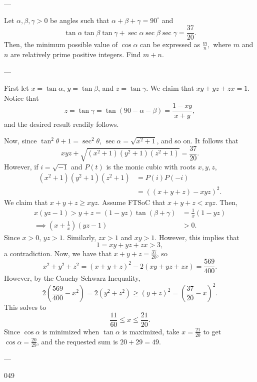 
---

Let $\alpha, \beta, \gamma>0$ be angles such that $\alpha+\beta+\gamma=90^\circ$ and \[\tan\alpha\tan\beta\tan\gamma+\sec\alpha\sec\beta\sec\gamma=\frac{37}{20}.\]Then, the minimum possible value of $\cos \alpha$ can be expressed as $\tfrac mn,$ where $m$ and $n$ are relatively prime positive integers$.$ Find $m+n.$

---

First let $x=\tan\alpha$, $y=\tan\beta$, and $z=\tan\gamma$. We claim that $xy+yz+zx=1$. Notice that \[z=\tan\gamma=\tan(90-\alpha-\beta)=\frac{1-xy}{x+y},\]
and the desired result readily follows.

Now, since $\tan^2\theta+1=\sec^2\theta$, $\sec\alpha=\sqrt{x^2+1}$, and so on. It follows that \[xyz+\sqrt{(x^2+1)(y^2+1)(z^2+1)}=\frac{37}{20}.\]
However, if $i=\sqrt{-1}$ and $P(t)$ is the monic cubic with roots $x,y,z$,
\begin{align*}
    (x^2+1)(y^2+1)(z^2+1)&=P(i)P(-i)\\
    &=((x+y+z)-xyz)^2.
\end{align*}
We claim that $x+y+z\ge xyz$. Assume FTSoC that $x+y+z<xyz$. Then,
\begin{align*}
    x(yz-1)>y+z=(1-yz)\tan(\beta+\gamma)&=\frac1x(1-yz)\\
    \implies \left(x+\frac1x\right)(yz-1)&>0.
\end{align*}
Since $x>0$, $yz>1$. Similarly, $zx>1$ and $xy>1$. However, this implies that \[1=xy+yz+zx>3,\]
a contradiction. Now, we have that $x+y+z=\tfrac{37}{20}$, so \[x^2+y^2+z^2=(x+y+z)^2-2(xy+yz+zx)=\frac{569}{400}.\]
However, by the Cauchy-Schwarz Inequality, \[2\left(\frac{569}{400}-x^2\right)=2(y^2+z^2)\ge (y+z)^2=\left(\frac{37}{20}-x\right)^2.\]
This solves to \[\frac{11}{60}\le x\le\frac{21}{20}.\]
Since $\cos\alpha$ is minimized when $\tan\alpha$ is maximized, take $x=\frac{21}{20}$ to get $\cos\alpha=\frac{20}{29}$, and the requested sum is $20+29=49$.

---

049
